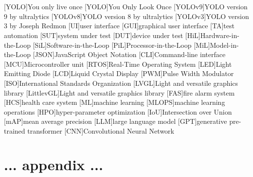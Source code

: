\documentclass[Bachelor, BIC, english, fhCitStyle, IEEE]{BASE/twbook} %
\begin{document}
\listoftables %
\clearpage

\listoflistings %
\clearpage

{}
\chapter*{\listacroname}
\begin{acronym}
    [YOLO]{You only live once}
    [YOLO]{You Only Look Once}
    [YOLOv9]{YOLO version 9 by ultralytics}
    [YOLOv8]{YOLO version 8 by ultralytics}
    [YOLOv3]{YOLO version 3 by Joseph Redmon}
    [UI]{user interface} [GUI]{graphical user interface}
    [TA]{test automation} [SUT]{system under test}
    [DUT]{device under test} [HiL]{Hardware-in-the-Loop}
    [SiL]{Software-in-the-Loop} [PiL]{Processor-in-the-Loop}
    [MiL]{Model-in-the-Loop}
    [JSON]{JavaScript Object Notation}
    [CLI]{Command-line interface}
    [MCU]{Microcontroller unit}
    [RTOS]{Real-Time Operating System}
    [LED]{Light Emitting Diode}
    [LCD]{Liquid Crystal Display}
    [PWM]{Pulse Width Modulator}
    [ISO]{International Standards Organization}
    [LVGL]{Light and versatile graphics library}
    [LittlevGL]{Light and versatile graphics library}
    [FAS]{fire alarm system}
    [HCS]{health care system}
    [ML]{machine learning}
    [MLOPS]{machine learning operations}
    [HPO]{hyper-parameter optimization}
    [IoU]{Intersection over Union}
    [mAP]{mean average precision}
    [LLM]{large language model}
    [GPT]{generative pre-trained transformer}
    [CNN]{Convolutional Neural Network}
\end{acronym}
\clearpage
\appendix
\chapter{... appendix ...}
\clearpage
\end{document}
